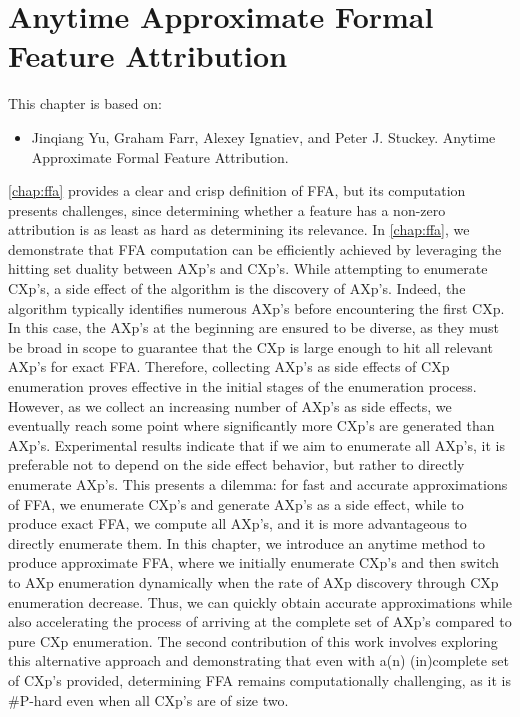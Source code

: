 \chapter{Anytime Approximate Formal Feature Attribution}\label{chap:marco}


This chapter is based on:
\begin{itemize}
	\item Jinqiang Yu, Graham Farr, Alexey Ignatiev, and Peter J. Stuckey. Anytime Approximate Formal
Feature Attribution.  
\end{itemize}

\autoref{chap:ffa} provides a clear and crisp definition of FFA, but its computation presents
challenges,
since determining whether a feature has a non-zero attribution is as
least as hard as determining its relevance.
%
In \autoref{chap:ffa}, we demonstrate that FFA computation can be efficiently achieved 
by leveraging the hitting set duality between AXp's and CXp's.
%
While attempting to enumerate CXp's, a side effect of the algorithm is 
the discovery of AXp's. 
%
Indeed, the algorithm typically identifies numerous AXp's before encountering the first CXp.
%
In this case, the AXp's at the beginning are ensured to be diverse, as they must be broad in scope
to guarantee that the CXp is large enough to hit all relevant AXp's for exact FFA.
%
Therefore, collecting AXp's as side effects of CXp enumeration proves effective in the 
initial stages of the enumeration process.
%
However, as we collect an increasing number of AXp's as side effects, we eventually 
reach some point where significantly more CXp's are generated than AXp's.
%
Experimental results indicate that if we aim to enumerate all AXp's, it is preferable not to 
depend on the side effect behavior, but rather to directly enumerate AXp's.
%
This presents a dilemma: for fast and accurate approximations of FFA, we enumerate CXp's and
generate AXp's as a side effect, while to produce exact FFA, we compute all AXp's, and it is more 
advantageous to directly enumerate them.
%
In this chapter, we introduce an anytime method to produce approximate FFA,
where we initially enumerate CXp's and then switch to AXp enumeration dynamically 
when the rate of AXp discovery through CXp enumeration decrease.
%
Thus, we can quickly obtain accurate approximations while also accelerating the process of 
arriving at the complete set of AXp's compared to pure CXp enumeration.
%
The second contribution of this work involves exploring this alternative approach 
and demonstrating that even with a(n) (in)complete set of CXp's provided, 
determining FFA remains computationally challenging, as it is \#P-hard even when 
all CXp's are of size two.


